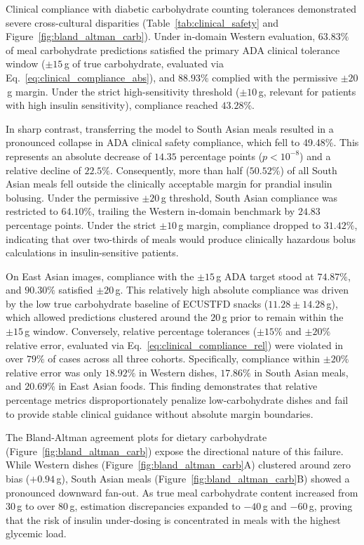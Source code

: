 \documentclass[utf8]{FrontiersinVancouver}
\begin{document}
Clinical compliance with diabetic carbohydrate counting tolerances demonstrated severe cross-cultural disparities (Table~\ref{tab:clinical_safety} and Figure~\ref{fig:bland_altman_carb}). Under in-domain Western evaluation, $63.83\%$ of meal carbohydrate predictions satisfied the primary ADA clinical tolerance window ($\pm 15$\,g of true carbohydrate, evaluated via Eq.~\ref{eq:clinical_compliance_abs}), and $88.93\%$ complied with the permissive $\pm 20$\,g margin. Under the strict high-sensitivity threshold ($\pm 10$\,g, relevant for patients with high insulin sensitivity), compliance reached $43.28\%$.

In sharp contrast, transferring the model to South Asian meals resulted in a pronounced collapse in ADA clinical safety compliance, which fell to 49.48\%. This represents an absolute decrease of $14.35$ percentage points ($p < 10^{-8}$) and a relative decline of $22.5\%$. Consequently, more than half ($50.52\%$) of all South Asian meals fell outside the clinically acceptable margin for prandial insulin bolusing. Under the permissive $\pm 20$\,g threshold, South Asian compliance was restricted to $64.10\%$, trailing the Western in-domain benchmark by $24.83$ percentage points. Under the strict $\pm 10$\,g margin, compliance dropped to $31.42\%$, indicating that over two-thirds of meals would produce clinically hazardous bolus calculations in insulin-sensitive patients.

On East Asian images, compliance with the $\pm 15$\,g ADA target stood at $74.87\%$, and $90.30\%$ satisfied $\pm 20$\,g. This relatively high absolute compliance was driven by the low true carbohydrate baseline of ECUSTFD snacks ($11.28 \pm 14.28$\,g), which allowed predictions clustered around the $20$\,g prior to remain within the $\pm 15$\,g window. Conversely, relative percentage tolerances ($\pm 15\%$ and $\pm 20\%$ relative error, evaluated via Eq.~\ref{eq:clinical_compliance_rel}) were violated in over $79\%$ of cases across all three cohorts. Specifically, compliance within $\pm 20\%$ relative error was only $18.92\%$ in Western dishes, $17.86\%$ in South Asian meals, and $20.69\%$ in East Asian foods. This finding demonstrates that relative percentage metrics disproportionately penalize low-carbohydrate dishes and fail to provide stable clinical guidance without absolute margin boundaries.

The Bland-Altman agreement plots for dietary carbohydrate (Figure~\ref{fig:bland_altman_carb}) expose the directional nature of this failure. While Western dishes (Figure~\ref{fig:bland_altman_carb}A) clustered around zero bias ($+0.94$\,g), South Asian meals (Figure~\ref{fig:bland_altman_carb}B) showed a pronounced downward fan-out. As true meal carbohydrate content increased from $30$\,g to over $80$\,g, estimation discrepancies expanded to $-40$\,g and $-60$\,g, proving that the risk of insulin under-dosing is concentrated in meals with the highest glycemic load.
\end{document}
